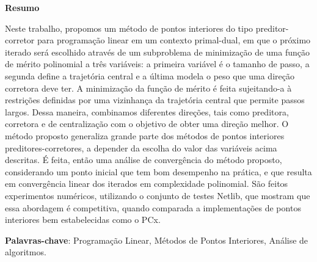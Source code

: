 \begin{center}
  \large{\textbf{Resumo}}
\end{center}

Neste trabalho, propomos um método de pontos interiores do tipo preditor-corretor para programação linear em um contexto primal-dual, em que o próximo iterado será escolhido através de um subproblema de minimização de uma função de mérito polinomial a três variáveis: a primeira variável é o tamanho de passo, a segunda define a trajetória central e a última modela o peso que uma direção corretora deve ter.  A minimização da função de mérito é feita  sujeitando-a à restrições  definidas por uma vizinhança da trajetória central que permite passos largos. Dessa maneira, combinamos diferentes direções, tais como preditora, corretora e de centralização com o objetivo de obter uma direção melhor. O método proposto generaliza grande parte dos métodos de pontos interiores preditores-corretores, a depender da escolha do valor das variáveis  acima descritas. É feita, então uma análise de convergência do método proposto, considerando um ponto inicial que tem bom desempenho na prática, e que resulta em convergência linear dos iterados em complexidade polinomial. São feitos experimentos numéricos, utilizando o conjunto de testes Netlib, que mostram que essa abordagem é competitiva, quando comparada a implementações de pontos interiores bem estabelecidas como o PCx.




\vspace{.2cm}
\textbf{Palavras-chave}:
Programação Linear, Métodos de Pontos Interiores, Análise de algoritmos.

